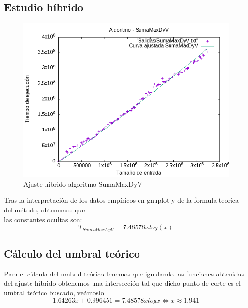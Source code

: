 \documentclass[11pt,openany]{book}
\begin{document}
\subsection{Estudio híbrido}
\begin{center}
      \begin{figure}[H]
            \centering
            \includegraphics[width=0.7\linewidth]{assets/Img/SumaMaxDyV_hib.png}
            \caption{Ajuste híbrido algoritmo SumaMaxDyV}
            \label{fig:sumaMax}
      \end{figure}
\end{center}
Tras la interpretación de los datos empíricos en gnuplot y de la formula teorica del método, obtenemos que \\
las constantes ocultas son:
\begin{equation*}
      T_{SumaMaxDyV}=7.48578x log(x)
\end{equation*}
\subsection{Cálculo del umbral teórico}
Para el cálculo del umbral teórico tenemos que igualando las funciones obtenidas del ajuste híbrido obtenemos 
una intersección tal que dicho punto de corte es el umbral teórico buscado, veámoslo
\begin{equation*}
      1.64263x+0.996451=7.48578xlog x \Leftrightarrow x \approx 1.941
\end{equation*}
\end{document}
